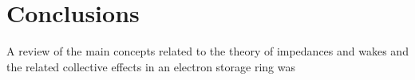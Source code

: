 %

\chapter*[Conclusions]{Conclusions}

    A review of the main concepts related to the theory of impedances and wakes and the related collective effects in an electron storage ring was


\postextual

% 
% 
% 



